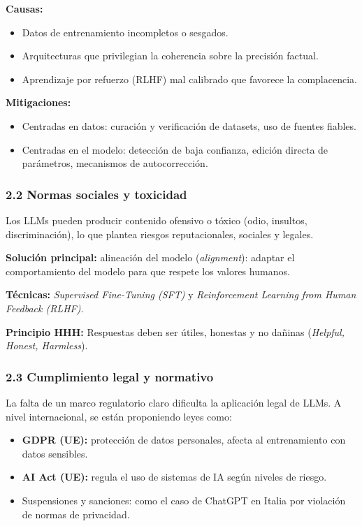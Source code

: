 \documentclass{article}
\begin{document}
\textbf{Causas:}
\begin{itemize} [leftmargin=3.5em]
    \item Datos de entrenamiento incompletos o sesgados.
    \item Arquitecturas que privilegian la coherencia sobre la precisión factual.
    \item Aprendizaje por refuerzo (RLHF) mal calibrado que favorece la complacencia.
\end{itemize}

\textbf{Mitigaciones:}
\begin{itemize} [leftmargin=3.5em]
    \item Centradas en datos: curación y verificación de datasets, uso de fuentes fiables.
    \item Centradas en el modelo: detección de baja confianza, edición directa de parámetros, mecanismos de autocorrección.
\end{itemize}

\subsubsection* {2.2 Normas sociales y toxicidad}
Los LLMs pueden producir contenido ofensivo o tóxico (odio, insultos, discriminación), lo que plantea riesgos reputacionales, sociales y legales.

\textbf{Solución principal:} alineación del modelo (\emph{alignment}): adaptar el comportamiento del modelo para que respete los valores humanos.

\textbf{Técnicas:} \emph{Supervised Fine-Tuning (SFT)} y \emph{Reinforcement Learning from Human Feedback (RLHF)}.

\textbf{Principio HHH:} Respuestas deben ser útiles, honestas y no dañinas (\emph{Helpful, Honest, Harmless}).

\subsubsection* {2.3 Cumplimiento legal y normativo}
La falta de un marco regulatorio claro dificulta la aplicación legal de LLMs. A nivel internacional, se están proponiendo leyes como:
\begin{itemize}
    \item \textbf{GDPR (UE):} protección de datos personales, afecta al entrenamiento con datos sensibles.
    \item \textbf{AI Act (UE):} regula el uso de sistemas de IA según niveles de riesgo.
    \item Suspensiones y sanciones: como el caso de ChatGPT en Italia por violación de normas de privacidad.
\end{itemize}
\end{document}
